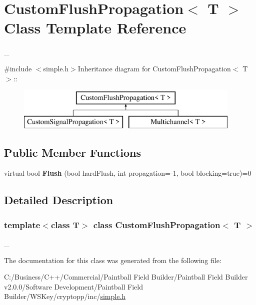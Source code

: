 \hypertarget{class_custom_flush_propagation}{
\section{CustomFlushPropagation$<$ T $>$ Class Template Reference}
\label{class_custom_flush_propagation}
}


\_\-  


{\ttfamily \#include $<$simple.h$>$}Inheritance diagram for CustomFlushPropagation$<$ T $>$::\begin{figure}[H]
\begin{center}
\leavevmode
\includegraphics[height=2cm]{class_custom_flush_propagation}
\end{center}
\end{figure}
\subsection*{Public Member Functions}
\begin{DoxyCompactItemize}
\item 
\hypertarget{class_custom_flush_propagation_ac0faa3bd64279e9ad1912cdcdff446ef}{
virtual bool {\bfseries Flush} (bool hardFlush, int propagation=-\/1, bool blocking=true)=0}
\label{class_custom_flush_propagation_ac0faa3bd64279e9ad1912cdcdff446ef}

\end{DoxyCompactItemize}


\subsection{Detailed Description}
\subsubsection*{template$<$class T$>$ class CustomFlushPropagation$<$ T $>$}

\_\- 

The documentation for this class was generated from the following file:\begin{DoxyCompactItemize}
\item 
C:/Business/C++/Commercial/Paintball Field Builder/Paintball Field Builder v2.0.0/Software Development/Paintball Field Builder/WSKey/cryptopp/inc/\hyperlink{simple_8h}{simple.h}\end{DoxyCompactItemize}
